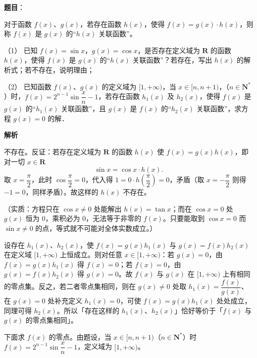 \begin{answer}

\textbf{题目}：

对于函数 \(f(x)\)、\(g(x)\)，若存在函数 \(h(x)\)，使得 \(f(x)=g(x)\cdot h(x)\)，则称 \(f(x)\) 是 \(g(x)\) 的“\(h(x)\) 关联函数”。

（1） 已知 \(f(x)=\sin x\)，\(g(x)=\cos x\)，是否存在定义域为 \(\mathbf{R}\) 的函数 \(h(x)\)，使得 \(f(x)\) 是 \(g(x)\) 的“\(h(x)\) 关联函数”？若存在，写出 \(h(x)\) 的解析式；若不存在，说明理由；

（2） 已知函数 \(f(x)\)、\(g(x)\) 的定义域为 \([1,+\infty)\)，当 \(x\in[n,n+1)\)，（\(n\in\mathbf{N}^{*}\)）时，\(f(x)=2^{n-1}\sin\dfrac{x}{n}-1\)，若存在函数 \(h_{1}(x)\) 及 \(h_{2}(x)\)，使得 \(f(x)\) 是 \(g(x)\) 的“\(h_{1}(x)\) 关联函数”，且 \(g(x)\) 是 \(f(x)\) 的“\(h_{2}(x)\) 关联函数”，求方程 \(g(x)=0\) 的解．

\textbf{解析}


不存在。反证：若存在定义域为 \(\mathbf{R}\) 的函数 \(h(x)\) 使 \(f(x)=g(x)h(x)\)，即对一切 \(x\in\mathbf{R}\)
\nopagebreak[4]
\[
\sin x=\cos x\cdot h(x).
\]
取 \(x=\dfrac{\pi}{2}\)，此时 \(\cos\dfrac{\pi}{2}=0\)，代入得 \(1=0\cdot h\left(\dfrac{\pi}{2}\right)=0\)，矛盾（取 \(x=-\dfrac{\pi}{2}\) 则得 \(-1=0\)，同样矛盾）。故这样的 \(h(x)\) 不存在。

（实质：方程只在 \(\cos x\neq0\) 处能解出 \(h(x)=\tan x\)；而在 \(\cos x=0\) 处 \(g(x)\) 恒为 \(0\)，乘积必为 \(0\)，无法等于非零的 \(f(x)\)。只要能取到 \(\cos x=0\) 而 \(\sin x\neq0\) 的点，等式就不可能对全体实数成立。）


设存在 \(h_{1}(x)\)、\(h_{2}(x)\)，使 \(f(x)=g(x)h_{1}(x)\) 与 \(g(x)=f(x)h_{2}(x)\) 在定义域 \([1,+\infty)\) 上恒成立。则对任意 \(x\in[1,+\infty)\)：若 \(g(x)=0\)，由 \(f(x)=g(x)h_{1}(x)\) 得 \(f(x)=0\)；若 \(f(x)=0\)，由 \(g(x)=f(x)h_{2}(x)\) 得 \(g(x)=0\)。故 \(f(x)\) 与 \(g(x)\) 在 \([1,+\infty)\) 上有相同的零点集。反之，若二者零点集相同，则在 \(g(x)\neq0\) 处取 \(h_{1}(x)=\dfrac{f(x)}{g(x)}\)、在 \(g(x)=0\) 处补充定义 \(h_{1}(x)=0\)，可使 \(f(x)=g(x)h_{1}(x)\) 处处成立，同理可得 \(h_{2}(x)\)。所以「存在这样的 \(h_{1}(x)\)、\(h_{2}(x)\)」恰好等价于「\(f(x)\) 与 \(g(x)\) 的零点集相同」。

下面求 \(f(x)\) 的零点。由题设，当 \(x\in[n,n+1)\)（\(n\in\mathbf{N}^{*}\)）时 \(f(x)=2^{n-1}\sin\dfrac{x}{n}-1\)，定义域为 \([1,+\infty)\)。


\end{answer}
